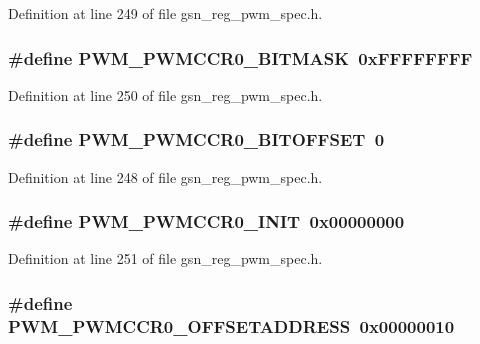 Definition at line 249 of file gsn\_\-reg\_\-pwm\_\-spec.h.

\hypertarget{a00565_a84d2c5ab073744cc88a2cd5ec7ad9da8}{
\subsubsection[{PWM\_\-PWMCCR0\_\-BITMASK}]{\setlength{\rightskip}{0pt plus 5cm}\#define PWM\_\-PWMCCR0\_\-BITMASK~0xFFFFFFFF}}
\label{a00565_a84d2c5ab073744cc88a2cd5ec7ad9da8}


Definition at line 250 of file gsn\_\-reg\_\-pwm\_\-spec.h.

\hypertarget{a00565_a3938e138ff2db3e10edfeaa93942082d}{
\subsubsection[{PWM\_\-PWMCCR0\_\-BITOFFSET}]{\setlength{\rightskip}{0pt plus 5cm}\#define PWM\_\-PWMCCR0\_\-BITOFFSET~0}}
\label{a00565_a3938e138ff2db3e10edfeaa93942082d}


Definition at line 248 of file gsn\_\-reg\_\-pwm\_\-spec.h.

\hypertarget{a00565_a65a30122017f33352742e6c4bd27a61c}{
\subsubsection[{PWM\_\-PWMCCR0\_\-INIT}]{\setlength{\rightskip}{0pt plus 5cm}\#define PWM\_\-PWMCCR0\_\-INIT~0x00000000}}
\label{a00565_a65a30122017f33352742e6c4bd27a61c}


Definition at line 251 of file gsn\_\-reg\_\-pwm\_\-spec.h.

\hypertarget{a00565_a96c4b7a9710e59bc16e7a9080c65d993}{
\subsubsection[{PWM\_\-PWMCCR0\_\-OFFSETADDRESS}]{\setlength{\rightskip}{0pt plus 5cm}\#define PWM\_\-PWMCCR0\_\-OFFSETADDRESS~0x00000010}}
\label{a00565_a96c4b7a9710e59bc16e7a9080c65d993}


